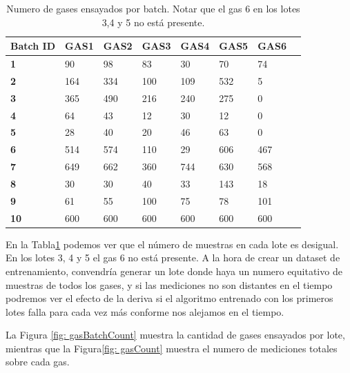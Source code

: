 \begin{table}
    \centering
    \begin{tabular}{>{\bfseries}l|l|l|l|l|l|l|l|}
    \toprule
        Batch ID & GAS1 & GAS2 & GAS3 & GAS4 & GAS5 & GAS6 \\  \midrule
        1 & 90   & 98  & 83  & 30  & 70  & 74   \\ \hline
        2 & 164  & 334 & 100 & 109 & 532 & 5    \\ \hline
        3 & 365  & 490 & 216 & 240 & 275 & 0    \\ \hline
        4 & 64   & 43  & 12  & 30  & 12  & 0    \\ \hline
        5 & 28   & 40  & 20  & 46  & 63  & 0    \\ \hline
        6 & 514  & 574 & 110 & 29  & 606 & 467  \\ \hline
        7 & 649  & 662 & 360 & 744 & 630 & 568  \\ \hline
        8 & 30   & 30  & 40  & 33  & 143 & 18   \\ \hline
        9 & 61   & 55  & 100 & 75  & 78  & 101  \\ \hline
        10 & 600 & 600 & 600 & 600 & 600 & 600  \\ \bottomrule
    \end{tabular}
    \caption{Numero de gases ensayados por batch. Notar que el gas 6 en los lotes 3,4 y 5 no está presente. \label{Tab: Numero de Gases por cada Batch}}
\end{table}


En la Tabla\ref{Tab: Numero de Gases por cada Batch} podemos ver que el número de muestras en cada lote es desigual. En los lotes 3, 4 y 5 el gas 6 no está presente. A la hora de crear un dataset de entrenamiento,
convendría generar un lote donde haya un numero equitativo de muestras de todos los gases,
y si las mediciones no son distantes en el tiempo podremos ver el efecto de la deriva si el algoritmo entrenado con
los primeros lotes falla para cada vez más conforme nos alejamos en el tiempo.

La Figura \ref{fig: gasBatchCount} muestra la cantidad de gases ensayados por lote, mientras que
la Figura\ref{fig: gasCount} muestra el numero de mediciones totales sobre cada gas.

